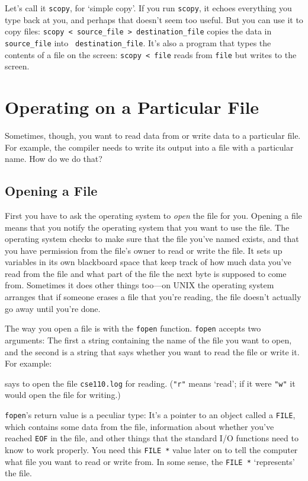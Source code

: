 Let's call it {\tt scopy}, for `simple copy'.  If you run {\tt scopy},
it echoes everything you type back at you, and perhaps that doesn't seem
too useful.  But you can use it to copy files: {\tt scopy < source\_file
> destination\_file} copies the data in {\tt source\_file} into {\tt
destination\_file}.  It's also a program that types the contents of a
file on the screen:  {\tt scopy < file} reads from {\tt file} but writes
to the screen.

\section{Operating on a Particular File}

Sometimes, though, you want to read data from or write data to a
particular file.  For example, the compiler needs to write its output
into a file with a particular name.  How do we do that?

\subsection{Opening a File}

First you have to ask the operating system to {\em open} the file for
you.  Opening a file means that you notify the operating system that you
want to use the file.  The operating system checks to make sure that the
file you've named exists, and that you have permission from the file's
owner to read or write the file.  It sets up variables in its own
blackboard space that keep track of how much data you've read from the
file and what part of the file the next byte is supposed to come from.
Sometimes it does other things too---on {\sc UNIX} the operating system
arranges that if someone erases a file that you're reading, the file
doesn't actually go away until you're done.

The way you open a file is with the {\tt fopen} function.  {\tt fopen}
accepts two arguments:  The first a string containing the name of the
file you want to open, and the second is a string that says whether you
want to read the file or write it.  For example:

\begin{flushleft}
\verb% fopen("cse110.log", "r"); % 
\end{flushleft}

\noindent says to open the file {\tt cse110.log} for reading.  ({\tt "r"}
means `read'; if it were {\tt "w"} it would open the file for writing.)

{\tt fopen}'s return value is a peculiar type: It's a pointer to an
object called a {\tt FILE}, which contains some data from the file,
information about whether you've reached {\tt EOF} in the file, and
other things that the standard I/O functions need to know to work
properly. You need this {\tt FILE *} value later on to tell the computer
what file you want to read or write from.  In some sense, the {\tt FILE
*} `represents' the file.


